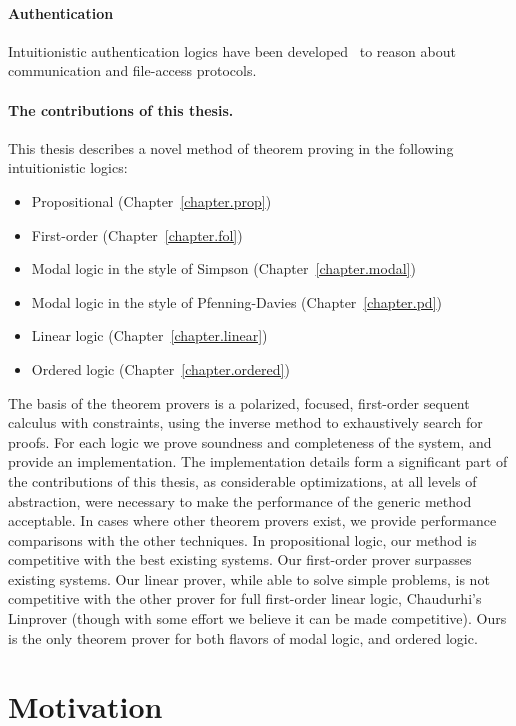 \paragraph{Authentication}
Intuitionistic authentication logics have been
developed~\cite{Garg.2010.SSP, Gurevich.2008.DKAL}
to reason about communication and file-access protocols.

\paragraph{The contributions of this thesis.}

This thesis describes a novel method of theorem proving in
the following intuitionistic logics:

\begin{itemize}
\item Propositional  (Chapter~\ref{chapter.prop})
\item First-order (Chapter~\ref{chapter.fol})
\item Modal logic in the style of Simpson (Chapter~\ref{chapter.modal})
\item Modal logic in the style of Pfenning-Davies (Chapter~\ref{chapter.pd})
\item Linear logic (Chapter~\ref{chapter.linear})
\item Ordered logic (Chapter~\ref{chapter.ordered})
\end{itemize}

\noindent
The basis of the theorem provers is a polarized, focused, first-order sequent
calculus with constraints, using the inverse method to exhaustively search for
proofs.  For each logic we prove soundness and completeness of the system, and
provide an implementation.  The implementation details form a significant
part of the contributions of this thesis, as considerable
optimizations, at all levels of abstraction, were
necessary to make the performance of the generic method acceptable.
In cases where other theorem provers exist, we
provide performance comparisons with the other techniques.  In propositional
logic, our method is competitive with the best existing systems.  Our
first-order prover surpasses existing systems.  Our linear prover, while
able to solve simple problems, is not competitive with the other prover for full
first-order linear logic, Chaudurhi's Linprover (though with some effort we
believe it can be made competitive).  Ours is the only theorem prover
for both flavors of modal logic, and ordered logic.


\section{Motivation}

